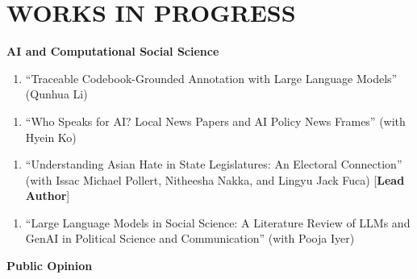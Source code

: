 \documentclass[10.5pt,]{article}
\providecommand{\tightlist}{%
	\setlength{\itemsep}{0pt}\setlength{\parskip}{0pt}}
\renewenvironment{itemize}{
	\begin{list}{}{
			\setlength{\leftmargin}{1.5em}
		}
	}{
	\end{list}
}
\begin{document}
\section{WORKS IN PROGRESS}\label{works-in-progress}

\begin{itemize}
\tightlist
\item
  \textbf{AI and Computational Social Science}

  \begin{itemize}
  \tightlist
  \item
    \begin{enumerate}
    \def\labelenumi{\arabic{enumi}.}
    \setcounter{enumi}{5}
    \tightlist
    \item
      ``Traceable Codebook-Grounded Annotation with Large Language
      Models'' (Qunhua Li)
    \end{enumerate}
  \item
    \begin{enumerate}
    \def\labelenumi{\arabic{enumi}.}
    \setcounter{enumi}{4}
    \tightlist
    \item
      ``Who Speaks for AI? Local News Papers and AI Policy News Frames''
      (with Hyein Ko)
    \end{enumerate}
  \item
    \begin{enumerate}
    \def\labelenumi{\arabic{enumi}.}
    \setcounter{enumi}{3}
    \tightlist
    \item
      ``Understanding Asian Hate in State Legislatures: An Electoral
      Connection'' (with Issac Michael Pollert, Nitheesha Nakka, and
      Lingyu Jack Fuca) {[}\textbf{Lead Author}{]}
    \end{enumerate}
  \item
    \begin{enumerate}
    \def\labelenumi{\arabic{enumi}.}
    \setcounter{enumi}{2}
    \tightlist
    \item
      ``Large Language Models in Social Science: A Literature Review of
      LLMs and GenAI in Political Science and Communication'' (with
      Pooja Iyer)
    \end{enumerate}
  \end{itemize}
\item
  \textbf{Public Opinion}


\end{itemize}
\end{document}
